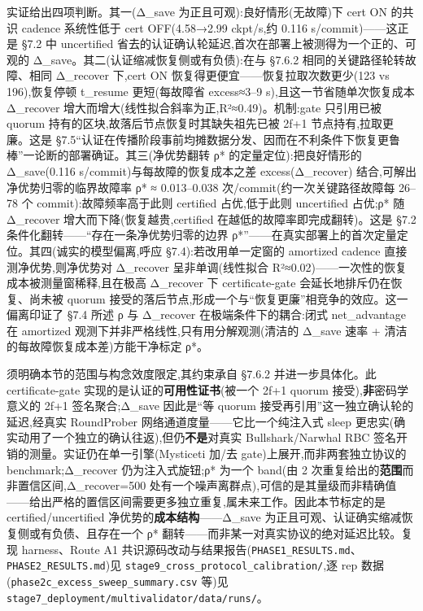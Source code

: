 \documentclass[UTF8,fontset=windows,a4paper,11pt]{ctexart}
\begin{document}
实证给出四项判断。其一(Δ\_save 为正且可观):良好情形(无故障)下 cert ON
的共识 cadence 系统性低于 cert OFF(4.58→2.99 ckpt/s,约 0.116
s/commit)------这正是 §7.2 中 uncertified
省去的认证确认轮延迟,首次在部署上被测得为一个正的、可观的
Δ\_save。其二(认证缩减恢复侧或有负债):在与 §7.6.2
相同的关键路径轮转故障、相同 Δ\_recover 下,cert ON
恢复得更便宜------恢复拉取次数更少(123 vs 196),恢复停顿 t\_resume
更短(每故障省 excess≈3--9 s),且这一节省随单次恢复成本 Δ\_recover
增大而增大(线性拟合斜率为正,R²≈0.49)。机制:gate 只引用已被 quorum
持有的区块,故落后节点恢复时其缺失祖先已被 2f+1 节点持有,拉取更廉。这是
§7.5``认证在传播阶段事前均摊数据分发、因而在不利条件下恢复更鲁棒''一论断的部署确证。其三(净优势翻转
ρ* 的定量定位):把良好情形的 Δ\_save(0.116
s/commit)与每故障的恢复成本之差 excess(Δ\_recover)
结合,可解出净优势归零的临界故障率 ρ* ≈ 0.013--0.038
次/commit(约一次关键路径故障每 26--78 个 commit):故障频率高于此则
certified 占优,低于此则 uncertified 占优;ρ* 随 Δ\_recover
增大而下降(恢复越贵,certified 在越低的故障率即完成翻转)。这是 §7.2
条件化翻转------``存在一条净优势归零的边界
ρ*''------在真实部署上的首次定量定位。其四(诚实的模型偏离,呼应
§7.4):若改用单一定窗的 amortized cadence 直接测净优势,则净优势对
Δ\_recover 呈非单调(线性拟合
R²≈0.02)------一次性的恢复成本被测量窗稀释,且在极高 Δ\_recover 下
certificate-gate 会延长地排斥仍在恢复、尚未被 quorum
接受的落后节点,形成一个与``恢复更廉''相竞争的效应。这一偏离印证了 §7.4
所述 ρ 与 Δ\_recover 在极端条件下的耦合:闭式 net\_advantage 在 amortized
观测下并非严格线性,只有用分解观测(清洁的 Δ\_save 速率 +
清洁的每故障恢复成本差)方能干净标定 ρ*。

须明确本节的范围与构念效度限定,其约束承自 §7.6.2 并进一步具体化。此
certificate-gate 实现的是认证的\textbf{可用性证书}(被一个 2f+1 quorum
接受),\textbf{非}密码学意义的 2f+1 签名聚合;Δ\_save 因此是``等 quorum
接受再引用''这一独立确认轮的延迟,经真实 RoundProber
网络通道度量------它比一个纯注入式 sleep
更忠实(确实动用了一个独立的确认往返),但仍\textbf{不是}对真实
Bullshark/Narwhal RBC 签名开销的测量。实证仍在单一引擎(Mysticeti 加/去
gate)上展开,而非两套独立协议的 benchmark;Δ\_recover 仍为注入式旋钮;ρ*
为一个 band(由 2 次重复给出的\textbf{范围}而非置信区间,Δ\_recover=500
处有一个噪声离群点),可信的是其量级而非精确值------给出严格的置信区间需要更多独立重复,属未来工作。因此本节标定的是
certified/uncertified 净优势的\textbf{成本结构}------Δ\_save
为正且可观、认证确实缩减恢复侧或有负债、且存在一个 ρ*
翻转------而非某一对真实协议的绝对延迟比较。复现 harness、Route A1
共识源码改动与结果报告(\texttt{PHASE1\_\allowbreak{}RESULTS.\allowbreak{}md}、\texttt{PHASE2\_\allowbreak{}RESULTS.\allowbreak{}md})见
\texttt{stage9\_\allowbreak{}cross\_\allowbreak{}protocol\_\allowbreak{}calibration/\allowbreak{}},逐 rep
数据(\texttt{phase2c\_\allowbreak{}excess\_\allowbreak{}sweep\_\allowbreak{}summary.\allowbreak{}csv} 等)见
\texttt{stage7\_\allowbreak{}deployment/\allowbreak{}multivalidator/\allowbreak{}data/\allowbreak{}runs/\allowbreak{}}。
\end{document}
